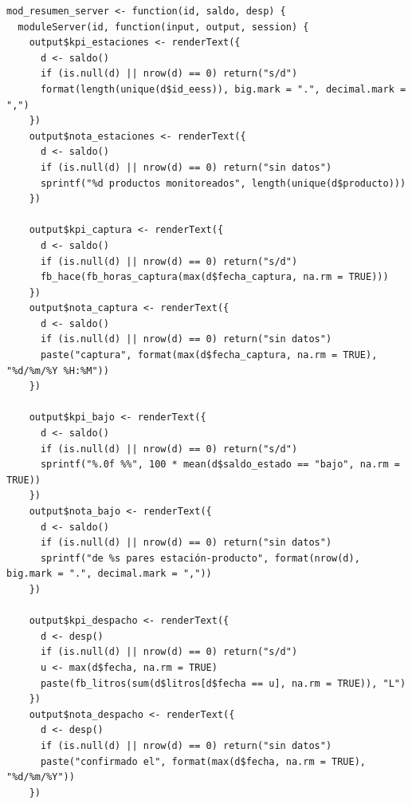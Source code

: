 \begin{lstlisting}[style=anexoR]
mod_resumen_server <- function(id, saldo, desp) {
  moduleServer(id, function(input, output, session) {
    output$kpi_estaciones <- renderText({
      d <- saldo()
      if (is.null(d) || nrow(d) == 0) return("s/d")
      format(length(unique(d$id_eess)), big.mark = ".", decimal.mark = ",")
    })
    output$nota_estaciones <- renderText({
      d <- saldo()
      if (is.null(d) || nrow(d) == 0) return("sin datos")
      sprintf("%d productos monitoreados", length(unique(d$producto)))
    })

    output$kpi_captura <- renderText({
      d <- saldo()
      if (is.null(d) || nrow(d) == 0) return("s/d")
      fb_hace(fb_horas_captura(max(d$fecha_captura, na.rm = TRUE)))
    })
    output$nota_captura <- renderText({
      d <- saldo()
      if (is.null(d) || nrow(d) == 0) return("sin datos")
      paste("captura", format(max(d$fecha_captura, na.rm = TRUE), "%d/%m/%Y %H:%M"))
    })

    output$kpi_bajo <- renderText({
      d <- saldo()
      if (is.null(d) || nrow(d) == 0) return("s/d")
      sprintf("%.0f %%", 100 * mean(d$saldo_estado == "bajo", na.rm = TRUE))
    })
    output$nota_bajo <- renderText({
      d <- saldo()
      if (is.null(d) || nrow(d) == 0) return("sin datos")
      sprintf("de %s pares estación-producto", format(nrow(d), big.mark = ".", decimal.mark = ","))
    })

    output$kpi_despacho <- renderText({
      d <- desp()
      if (is.null(d) || nrow(d) == 0) return("s/d")
      u <- max(d$fecha, na.rm = TRUE)
      paste(fb_litros(sum(d$litros[d$fecha == u], na.rm = TRUE)), "L")
    })
    output$nota_despacho <- renderText({
      d <- desp()
      if (is.null(d) || nrow(d) == 0) return("sin datos")
      paste("confirmado el", format(max(d$fecha, na.rm = TRUE), "%d/%m/%Y"))
    })


\end{lstlisting}
